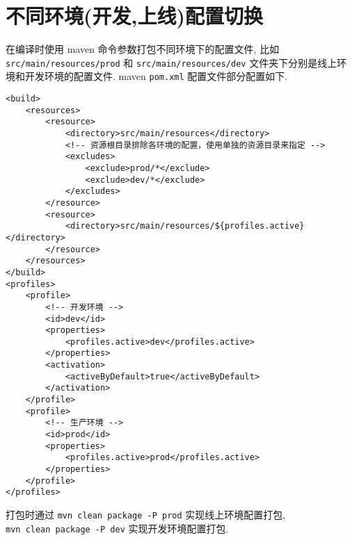 \section{不同环境(开发,上线)配置切换}\label{ux4e0dux540cux73afux5883ux5f00ux53d1ux4e0aux7ebfux914dux7f6eux5207ux6362}

在编译时使用 maven 命令参数打包不同环境下的配置文件, 比如
\texttt{src/main/resources/prod} 和 \texttt{src/main/resources/dev}
文件夹下分别是线上环境和开发环境的配置文件. maven \texttt{pom.xml}
配置文件部分配置如下.

\begin{verbatim}
<build>
    <resources>
        <resource>
            <directory>src/main/resources</directory>
            <!-- 资源根目录排除各环境的配置，使用单独的资源目录来指定 -->
            <excludes>
                <exclude>prod/*</exclude>
                <exclude>dev/*</exclude>
            </excludes>
        </resource>
        <resource>
            <directory>src/main/resources/${profiles.active}</directory>
        </resource>
    </resources>
</build>
<profiles>
    <profile>
        <!-- 开发环境 -->
        <id>dev</id>
        <properties>
            <profiles.active>dev</profiles.active>
        </properties>
        <activation>
            <activeByDefault>true</activeByDefault>
        </activation>
    </profile>
    <profile>
        <!-- 生产环境 -->
        <id>prod</id>
        <properties>
            <profiles.active>prod</profiles.active>
        </properties>
    </profile>
</profiles>
\end{verbatim}

打包时通过 \texttt{mvn\ clean\ package\ -P\ prod} 实现线上环境配置打包,
\texttt{mvn\ clean\ package\ -P\ dev} 实现开发环境配置打包.
